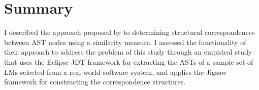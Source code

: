 

\section{Summary}  \label{summary}
I described the approach proposed by \citet{2008:fse:cottrell} to determining structural correspondences between AST nodes using a similarity measure. I assessed the functionality of their approach to address the problem of this study through an empirical study that uses the Eclipse JDT framework for extracting the ASTs of a sample set of LMs selected from a real-world software system, and applies the Jigsaw framework for constructing the correspondence structures.





